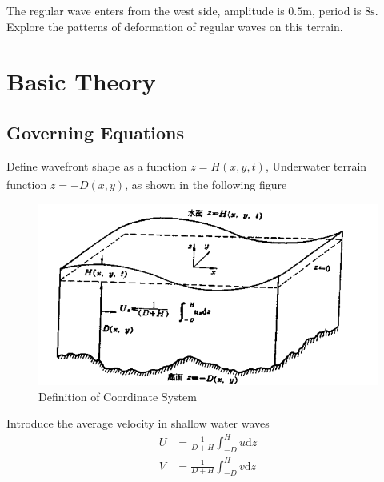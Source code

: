 \documentclass[10pt,a4paper]{article}
\newcommand{\td}{\mbox{d}}
\newcommand{\upcite}[1]{\textsuperscript{\zihao{5}\cite{#1}}}
\begin{document}
The regular wave enters from the west side, amplitude is $0.5\mbox{m}$, period is $8\mbox{s}$. Explore the patterns of deformation of regular waves on this terrain.
\newpage
\section{Basic Theory}
\subsection{Governing Equations}
	Define wavefront shape as a function $z = H(x, y, t)$, Underwater terrain function $z = -D(x, y)$, as shown in the following figure\upcite{1}
\begin{figure}[h]
	\includegraphics[width=\textwidth]{coordinates.png}
	\caption{Definition of Coordinate System}
\end{figure}

Introduce the average velocity in shallow water waves
\begin{equation}
	\begin{aligned}
		U &= \frac{1}{D+H}\int_{-D}^{H}u \td z\\
		V &= \frac{1}{D+H}\int_{-D}^{H}v \td z
	\end{aligned}
\end{equation}
\end{document}
